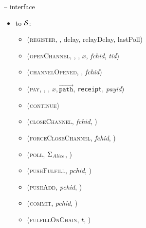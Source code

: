 \begin{figure}[H]
\begin{systembox}{\fpaynet{} -- interface}
\begin{itemize}
\begin{itemize}
          \item (\textsc{corrupted}, \alice)
          \item (\textsc{channelAnnounced}, \alice, $p_{\alice, F}, p_{\bob,
          F}$, \textit{fchid}, \textit{pchid}, \textit{tid})
          \item (\textsc{update}, \texttt{receipt}, \alice)
          \item (\textsc{closedChannel}, \texttt{channel}, \alice)
          \item (\textsc{resolvePays}, \textit{payid}, \texttt{charged})
        \end{itemize}
        \item to $\mathcal{S}$:
        \begin{itemize}
          \item (\textsc{register}, \alice, delay, relayDelay, lastPoll)
          \item (\textsc{openChannel}, \alice, \bob, $x$, \textit{fchid},
          \textit{tid})
          \item (\textsc{channelOpened}, \alice, \textit{fchid})
          \item (\textsc{pay}, \alice, \bob, $x,
          \overrightarrow{\mathtt{path}}$, \texttt{receipt}, \textit{payid})
          \item (\textsc{continue})
          \item (\textsc{closeChannel}, \textit{fchid}, \alice)
          \item (\textsc{forceCloseChannel}, \textit{fchid}, \alice)
          \item (\textsc{poll}, $\Sigma_{\mathit{Alice}}$, \alice)
          \item (\textsc{pushFulfill}, \textit{pchid}, \alice)
          \item (\textsc{pushAdd}, \textit{pchid}, \alice)
          \item (\textsc{commit}, \textit{pchid}, \alice)
          \item (\textsc{fulfillOnChain}, $t$, \alice)
        \end{itemize}
      \end{itemize}
    \end{systembox}
    \caption{}
    \label{alg:fpaynet:interface}
  \end{figure}

